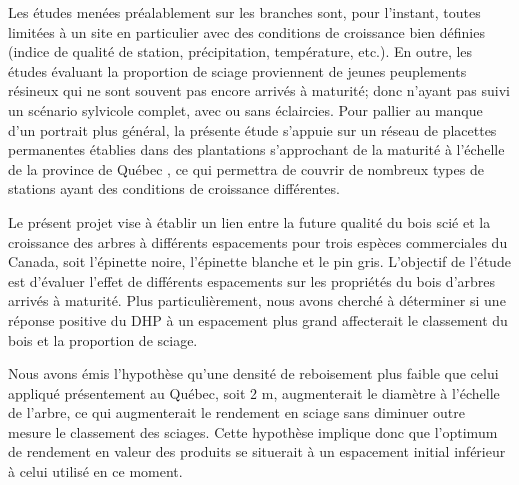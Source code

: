 \documentclass[letterpaper, 12pt]{article}
\begin{document}
\begin{onehalfspace}
\vspace{12pt}

Les études menées préalablement sur les branches sont, pour l'instant, toutes limitées à un site en particulier avec des conditions de croissance bien définies (indice de qualité de station, précipitation, température, etc.). En outre, les études évaluant la proportion de sciage proviennent de jeunes peuplements résineux qui ne sont souvent pas encore arrivés à maturité; donc n’ayant pas suivi un scénario sylvicole complet, avec ou sans éclaircies. Pour pallier au manque d'un portrait plus général, la présente étude s’appuie sur un réseau de placettes permanentes établies dans des plantations s'approchant de la maturité à l’échelle de la province de Québec %
, ce qui permettra de couvrir de nombreux types de stations ayant des conditions de croissance différentes. 

\vspace{12pt}


Le présent projet vise à établir un lien entre la future qualité du bois scié et la croissance des arbres à différents espacements pour trois espèces commerciales du Canada, soit l'épinette noire, l'épinette blanche et le pin gris. L'objectif de l'étude est d'évaluer l'effet de différents espacements sur les propriétés du bois d'arbres arrivés à maturité. Plus particulièrement, nous avons cherché à déterminer si une réponse positive du DHP à un espacement plus grand affecterait le classement du bois et la proportion de sciage.

\vspace{12pt}

Nous avons émis l'hypothèse qu'une densité de reboisement plus faible que celui appliqué présentement au Québec, soit 2 m, augmenterait le diamètre à l'échelle de l'arbre, ce qui augmenterait le rendement en sciage sans diminuer outre mesure le classement des sciages. Cette hypothèse implique donc que l'optimum de rendement en valeur des produits se situerait à un espacement initial inférieur à celui utilisé en ce moment. 


\end{onehalfspace}
\end{document}
